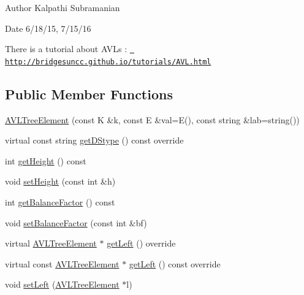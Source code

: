 \begin{DoxyAuthor}{Author}
Kalpathi Subramanian 
\end{DoxyAuthor}
\begin{DoxyDate}{Date}
6/18/15, 7/15/16
\end{DoxyDate}
There is a tutorial about A\+V\+Ls \+: \href{http://bridgesuncc.github.io/tutorials/AVL.html}{\texttt{ http\+://bridgesuncc.\+github.\+io/tutorials/\+A\+V\+L.\+html}} \subsection*{Public Member Functions}
\begin{DoxyCompactItemize}
\item 
\mbox{\hyperlink{classbridges_1_1datastructure_1_1_a_v_l_tree_element_a611fc818eeb478e330ef585adcefd9e6}{A\+V\+L\+Tree\+Element}} (const K \&k, const E \&val=E(), const string \&lab=string())
\item 
virtual const string \mbox{\hyperlink{classbridges_1_1datastructure_1_1_a_v_l_tree_element_ab04d1e9ad4630e408041e8137dc9854a}{get\+D\+Stype}} () const override
\item 
int \mbox{\hyperlink{classbridges_1_1datastructure_1_1_a_v_l_tree_element_a5d4b990d49f6f3d2f23f4dd3e57414e8}{get\+Height}} () const
\item 
void \mbox{\hyperlink{classbridges_1_1datastructure_1_1_a_v_l_tree_element_af387bcd2b37b7284ea983acafecff93c}{set\+Height}} (const int \&h)
\item 
int \mbox{\hyperlink{classbridges_1_1datastructure_1_1_a_v_l_tree_element_ade3c059448d00ac50dac89e59864b11f}{get\+Balance\+Factor}} () const
\item 
void \mbox{\hyperlink{classbridges_1_1datastructure_1_1_a_v_l_tree_element_a32af51a86585479c28de425374df95e9}{set\+Balance\+Factor}} (const int \&bf)
\item 
virtual \mbox{\hyperlink{classbridges_1_1datastructure_1_1_a_v_l_tree_element}{A\+V\+L\+Tree\+Element}} $\ast$ \mbox{\hyperlink{classbridges_1_1datastructure_1_1_a_v_l_tree_element_ab05925e343b9fa71b61c71e8034e1293}{get\+Left}} () override
\item 
virtual const \mbox{\hyperlink{classbridges_1_1datastructure_1_1_a_v_l_tree_element}{A\+V\+L\+Tree\+Element}} $\ast$ \mbox{\hyperlink{classbridges_1_1datastructure_1_1_a_v_l_tree_element_a4a639e0c623435aadf5c51ed132cb25d}{get\+Left}} () const override
\item 
void \mbox{\hyperlink{classbridges_1_1datastructure_1_1_a_v_l_tree_element_af6c8a71789ff45481786fd4d63cbbcbe}{set\+Left}} (\mbox{\hyperlink{classbridges_1_1datastructure_1_1_a_v_l_tree_element}{A\+V\+L\+Tree\+Element}} $\ast$l)

\end{DoxyCompactItemize}

